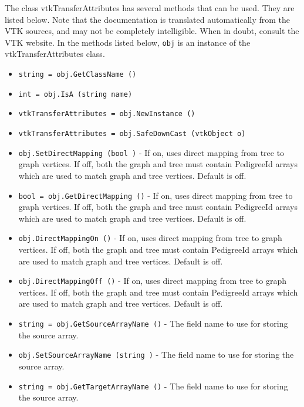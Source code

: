 The class vtkTransferAttributes has several methods that can be used.
  They are listed below.
Note that the documentation is translated automatically from the VTK sources,
and may not be completely intelligible.  When in doubt, consult the VTK website.
In the methods listed below, \verb|obj| is an instance of the vtkTransferAttributes class.
\begin{itemize}
\item  \verb|string = obj.GetClassName ()|

\item  \verb|int = obj.IsA (string name)|

\item  \verb|vtkTransferAttributes = obj.NewInstance ()|

\item  \verb|vtkTransferAttributes = obj.SafeDownCast (vtkObject o)|

\item  \verb|obj.SetDirectMapping (bool )| -  If on, uses direct mapping from tree to graph vertices.
 If off, both the graph and tree must contain PedigreeId arrays
 which are used to match graph and tree vertices.
 Default is off.

\item  \verb|bool = obj.GetDirectMapping ()| -  If on, uses direct mapping from tree to graph vertices.
 If off, both the graph and tree must contain PedigreeId arrays
 which are used to match graph and tree vertices.
 Default is off.

\item  \verb|obj.DirectMappingOn ()| -  If on, uses direct mapping from tree to graph vertices.
 If off, both the graph and tree must contain PedigreeId arrays
 which are used to match graph and tree vertices.
 Default is off.

\item  \verb|obj.DirectMappingOff ()| -  If on, uses direct mapping from tree to graph vertices.
 If off, both the graph and tree must contain PedigreeId arrays
 which are used to match graph and tree vertices.
 Default is off.

\item  \verb|string = obj.GetSourceArrayName ()| -  The field name to use for storing the source array.

\item  \verb|obj.SetSourceArrayName (string )| -  The field name to use for storing the source array.

\item  \verb|string = obj.GetTargetArrayName ()| -  The field name to use for storing the source array.


\end{itemize}
